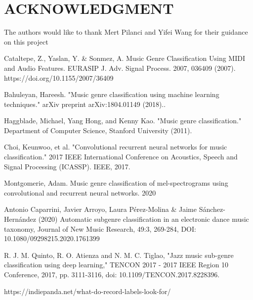 \documentclass[letterpaper, 12 pt, conference]{ieeeconf}  %
\begin{document}
\section*{ACKNOWLEDGMENT}

The authors would like to thank Mert Pilanci and Yifei Wang for their guidance on this project



\begin{thebibliography}{99}



 Cataltepe, Z., Yaslan, Y. & Sonmez, A. Music Genre Classification Using MIDI and Audio Features. EURASIP J. Adv. Signal Process. 2007, 036409 (2007). https://doi.org/10.1155/2007/36409

 Bahuleyan, Hareesh. "Music genre classification using machine learning techniques." arXiv preprint arXiv:1804.01149 (2018)..

 Haggblade, Michael, Yang Hong, and Kenny Kao. "Music genre classification." Department of Computer Science, Stanford University (2011). 

 Choi, Keunwoo, et al. "Convolutional recurrent neural networks for music classification." 2017 IEEE International Conference on Acoustics, Speech and Signal Processing (ICASSP). IEEE, 2017.


 Montgomerie, Adam.  Music genre classification of mel-spectrograms using convolutional and
recurrent neural networks. 2020

  Antonio Caparrini, Javier Arroyo, Laura Pérez-Molina & Jaime Sánchez-Hernández (2020) Automatic subgenre classification in an electronic dance music taxonomy, Journal of New Music Research, 49:3, 269-284, DOI: 10.1080/09298215.2020.1761399



 R. J. M. Quinto, R. O. Atienza and N. M. C. Tiglao, "Jazz music sub-genre classification using deep learning," TENCON 2017 - 2017 IEEE Region 10 Conference, 2017, pp. 3111-3116, doi: 10.1109/TENCON.2017.8228396.


 https://indiepanda.net/what-do-record-labels-look-for/


\end{thebibliography}
\end{document}
